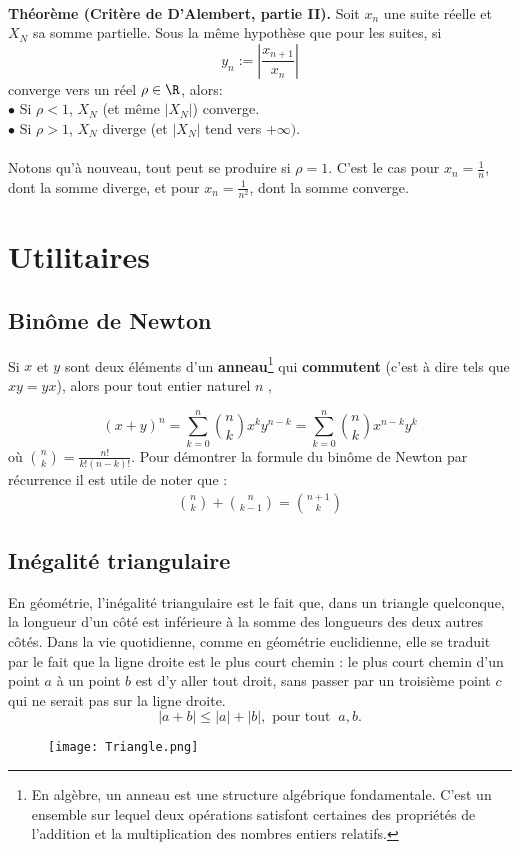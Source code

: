 \documentclass[oneside,11pt,french,table]{book}
\theoremstyle{definition}
\theoremstyle{plain}
\theoremstyle{remark}
\begin{document}
\\
\textbf{Théorème (Critère de D'Alembert, partie II).} Soit $x_n$ une suite réelle et $X_N$ sa somme partielle. Sous la même hypothèse que pour les suites, si $$y_n := \left| \dfrac{x_{n+1}}{x_n} \right|$$ converge vers un réel $\rho \in \R$, alors: \\
$\bullet$ Si $\rho < 1$, $X_N$ (et même $|X_N|$) converge. \\
$\bullet$ Si $\rho > 1$, $X_N$ diverge (et $|X_N|$ tend vers $+\infty)$. \\ \\
Notons qu'à nouveau, tout peut se produire si $\rho = 1$. C'est le cas pour $x_n = \frac{1}{n}$, dont la somme diverge, et pour $x_n = \frac{1}{n^2}$, dont la somme converge.
\chapter{Utilitaires}
\section{Binôme de Newton}
\label{binomenewt}

Si $x$ et $y$ sont deux éléments d'un \textbf{anneau}\footnote{En algèbre, un anneau est une structure algébrique fondamentale. C'est un ensemble sur lequel deux opérations satisfont certaines des propriétés de l'addition et la multiplication des nombres entiers relatifs. } qui \textbf{commutent} (c'est à dire tels que $xy=yx$), alors pour tout entier naturel $n$ , 
\boldmath{}

\begin{equation}
    (x+y)^{n}=\sum_{k=0}^{n}\binom{n}{k}x^ky^{n-k}=\sum_{k=0}^n\binom{n}{k}x^{n-k}y^k
\end{equation}
\unboldmath{} où $\binom{n}{k}=\displaystyle\frac{n!}{k!(n-k)!}$.
Pour démontrer la formule du binôme de Newton par récurrence il est utile de noter que : \ \begin{eqnarray}
\binom{n}{k}+\binom{n}{k-1}=\binom{n+1}{k}
\end{eqnarray}
\section{Inégalité triangulaire}\label{inegalite_triangulaire}

En géométrie, l'inégalité triangulaire est le fait que, dans un triangle quelconque, la longueur d'un côté est inférieure à la somme des longueurs des deux autres côtés. Dans la vie quotidienne, comme en géométrie euclidienne, elle se traduit par le fait que la ligne droite est le plus court chemin : le plus court chemin d'un point $a$ à un point $b$ est d'y aller tout droit, sans passer par un troisième point $c$ qui ne serait pas sur la ligne droite. 
\begin{equation}
|a+b|\leq |a|+|b|, \text{ pour tout } \ a,b.
    \label{inegal_tri}
\end{equation}
 \begin{figure}[!h]
     \centering
     \texttt{[image: Triangle.png]}
     \caption{}
     \label{inegal_tri_geom}
 \end{figure}
\end{document}

